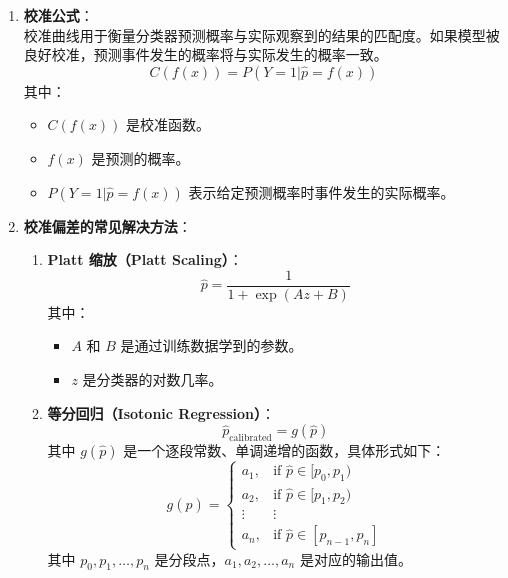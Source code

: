 \documentclass[12pt]{article}
\numberwithin{theorem}{section} %
\numberwithin{definition}{section} %
\numberwithin{assumption}{section} %
\numberwithin{lemma}{section} %
\numberwithin{remark}{section} %
\numberwithin{prop}{section} %
\numberwithin{corollary}{section} %
\numberwithin{example}{section} %
\numberwithin{question}{section} %
\numberwithin{problem}{section} %
\numberwithin{conjecture}{section} %
\numberwithin{append}{section} %
\numberwithin{property}{section} %
\begin{document}
\begin{CJK}{UTF8}{gbsn}
\begin{itemize}
	\begin{enumerate}
		\item \textbf{校准公式}： \\
		校准曲线用于衡量分类器预测概率与实际观察到的结果的匹配度。如果模型被良好校准，预测事件发生的概率将与实际发生的概率一致。
		\begin{equation}
			C(f(x)) = P(Y=1 | \hat{p}=f(x))
		\end{equation}
		其中：
		\begin{itemize}
			\item \( C(f(x)) \) 是校准函数。
			\item \( f(x) \) 是预测的概率。
			\item \( P(Y=1 | \hat{p}=f(x)) \) 表示给定预测概率时事件发生的实际概率。
		\end{itemize}
		
		\item \textbf{校准偏差的常见解决方法}：
		\begin{enumerate}
			\item \textbf{Platt 缩放（Platt Scaling）}：
			\begin{equation}
				\hat{p} = \frac{1}{1 + \exp(Az + B)}
			\end{equation}
			其中：
			\begin{itemize}
				\item \( A \) 和 \( B \) 是通过训练数据学到的参数。
				\item \( z \) 是分类器的对数几率。
			\end{itemize}
			
			\item \textbf{等分回归（Isotonic Regression）}：
			\begin{equation}
				\hat{p}_{\text{calibrated}} = g(\hat{p})
			\end{equation}
			其中 \( g(\hat{p}) \) 是一个逐段常数、单调递增的函数，具体形式如下：
			\begin{equation}
				g(\hat{p}) = 
				\begin{cases}
					a_1, & \text{if } \hat{p} \in [p_0, p_1) \\
					a_2, & \text{if } \hat{p} \in [p_1, p_2) \\
					\vdots & \vdots \\
					a_n, & \text{if } \hat{p} \in [p_{n-1}, p_n]
				\end{cases}
			\end{equation}
			其中 \( p_0, p_1, \ldots, p_n \) 是分段点，\( a_1, a_2, \ldots, a_n \) 是对应的输出值。
			

\end{enumerate}
\end{enumerate}
\end{itemize}
\end{CJK}
\end{document}
